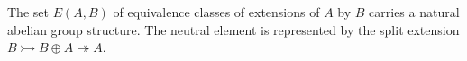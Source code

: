 The set $E(A, B)$ of equivalence classes of extensions of $A$ by $B$ carries a natural abelian group structure. The neutral element is represented by the split extension $B \rightarrowtail B \oplus A \twoheadrightarrow A$.
